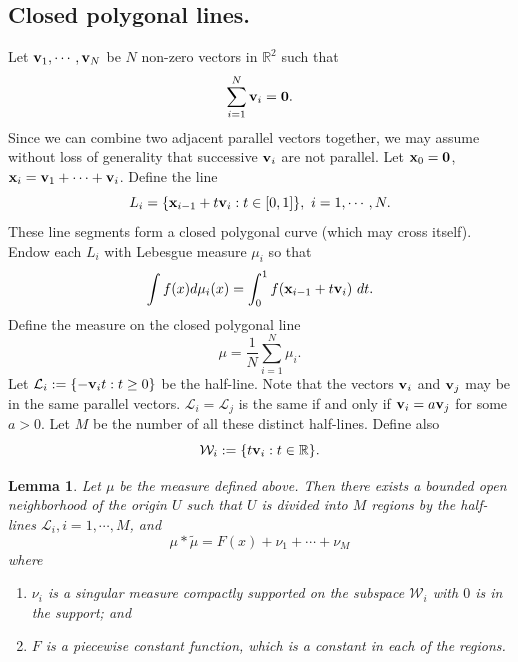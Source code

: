 \documentclass[12pt,a4paper,oneside]{amsart}
\newtheorem{lemma}{Lemma}
\theoremstyle{definition}
\newcommand{\RR}{{\mathbb R}}
\newcommand{\wt}[1]{\widetilde{#1}}
\newcommand{\red}[1]{\textcolor{red}{{#1}}}
\newcounter{rem}
\begin{document}
\subsection{Closed polygonal lines.} Let ${\bf v}_1,\cdots, {\bf v}_N$ be $N$ non-zero vectors in $\RR^2$ such that 
$$
\sum_{i=1}^N {\bf v}_i = {\bf 0}.
$$
Since we can combine two adjacent parallel vectors together, we may assume without loss of generality that {successive ${\bf v}_i$} are not parallel.  Let ${\bf x}_0 = {\bf 0}$, ${\bf x}_i = {\bf v}_1+\cdots+{\bf v}_i$. Define  the line 
$$
L_i = \{{\bf x}_{i-1}+t{\bf v}_i: t\in[0,1]\}, \ i = 1,\cdots, N.
$$ 
These {line segments} form a closed polygonal curve ({which} may cross itself). Endow each $L_i$ with Lebesgue measure $\mu_i$ so that 
$$
\int f(x)d\mu_i(x) = \int_0^1 f({\bf x}_{i-1}+t{\bf v}_i) ~dt.
$$
Define the measure on the closed polygonal line
$$
\mu = \frac1N \sum_{i=1}^N \mu_i.
$$ 
Let  ${\mathcal L}_i: = \{-{\bf v}_i t: t\ge 0\}$ be the half-line. Note that the vectors ${\bf v}_i$ and ${\bf v}_j$ may be in the same parallel vectors.  ${\mathcal L}_i ={\mathcal L}_j$ is the same if and only if  ${\bf v}_i = a {\bf v}_j$ for some $a>0$. Let $M$ be the number of all these distinct half-lines. Define also 
$$
{\mathcal W}_i : = \{t{\bf v}_i: t\in\RR\}.
$$
\begin{lemma} \label{lemma-structure-mu*mu} Let  $\mu$ be the measure defined above. Then there exists a bounded open neighborhood of the origin $U$ such that  $U$ is divided into $M$ regions by the {half-}lines ${\mathcal L}_i, i = 1,\cdots,M$, and  
$$
 \mu\ast\wt{\mu} = {F(x)}+ \nu_1+\cdots+\nu_M
 $$
 where
 \begin{enumerate}
 \item $\nu_i$ is a singular measure compactly supported on the subspace ${\mathcal W}_i$ with $0$ is in the support; and 
 \item $F$ is a piecewise constant function, which is a constant in each of the regions. 
 \end{enumerate}
 \end{lemma}
\end{document}
